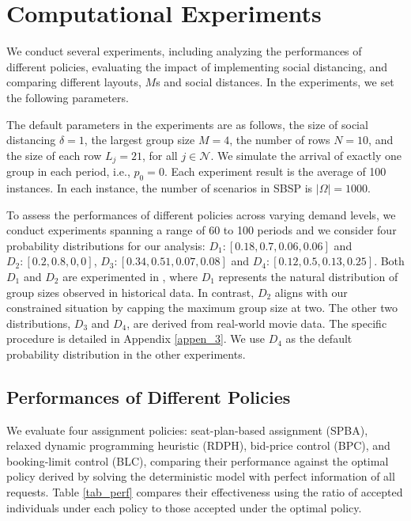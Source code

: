 \section{Computational Experiments}\label{sec_result}
We conduct several experiments, including analyzing the performances of different policies, evaluating the impact of implementing social distancing, and comparing different layouts, $M$s and social distances. In the experiments, we set the following parameters. 

The default parameters in the experiments are as follows, the size of social distancing $\delta =1$, the largest group size $M =4$, the number of rows $N = 10$, and the size of each row $L_j = 21$, for all $j \in \mathcal{N}$. We simulate the arrival of exactly one group in each period, i.e., $p_0 = 0$. Each experiment result is the average of 100 instances. In each instance, the number of scenarios in SBSP is $|\Omega| = 1000$.

To assess the performances of different policies across varying demand levels, we conduct experiments spanning a range of 60 to 100 periods and we consider four probability distributions for our analysis: $D_1:[0.18,0.7,0.06,0.06]$ and $D_2:[0.2,0.8,0,0]$, $D_3: [0.34, 0.51, 0.07, 0.08]$ and $D_4: [0.12, 0.5, 0.13, 0.25]$. Both $D_1$ and $D_2$ are experimented in \cite{blom2022filling}, where $D_1$ represents the natural distribution of group sizes observed in historical data. In contrast, $D_2$ aligns with our constrained situation by capping the maximum group size at two. The other two distributions, $D_3$ and $D_4$, are derived from real-world movie data. The specific procedure is detailed in Appendix \ref{appen_3}. We use $D_4$ as the default probability distribution in the other experiments.


\subsection{Performances of Different Policies}
We evaluate four assignment policies: seat-plan-based assignment (SPBA), relaxed dynamic programming heuristic (RDPH), bid-price control (BPC), and booking-limit control (BLC), comparing their performance against the optimal policy derived by solving the deterministic model with perfect information of all requests. Table \ref{tab_perf} compares their effectiveness using the ratio of accepted individuals under each policy to those accepted under the optimal policy.


